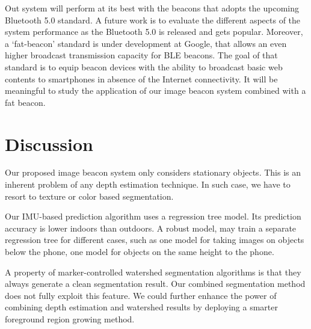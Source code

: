 Out system will perform at its best with the beacons that adopts the upcoming Bluetooth 5.0 standard. A future work is to evaluate the different aspects of the system performance as the Bluetooth 5.0 is released and gets popular. Moreover, a `fat-beacon' standard is under development at Google, that allows an even higher broadcast transmission capacity for BLE beacons. The goal of that standard is to equip beacon devices with the ability to broadcast basic web contents to smartphones in absence of the Internet connectivity. It will be meaningful to study the application of our image beacon system combined with a fat beacon.


\section{Discussion}
\label{sec:discussion}


Our proposed image beacon system only considers stationary objects. This is an inherent problem of any depth estimation technique. In such case, we have to resort to texture or color based segmentation.


Our IMU-based prediction algorithm uses a regression tree model. Its prediction accuracy is lower indoors than outdoors. A robust model, may train a separate regression tree for different cases, such as one model for taking images on objects below the phone, one model for objects on the same height to the phone.


A property of marker-controlled watershed segmentation algorithms is that they always generate a clean segmentation result. Our combined segmentation method does not fully exploit this feature. We could further enhance the power of combining depth estimation and watershed results by deploying a smarter foreground region growing method.

